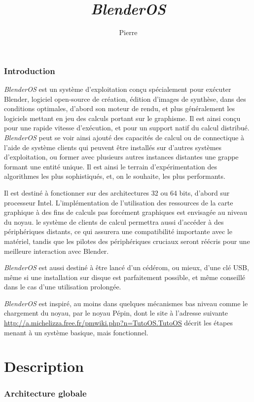 \documentclass{article}
\author{Pierre \bsc{Donat-Bouillud}}
\title{\emph{BlenderOS}}
\begin{document}
\maketitle

\section*{Introduction}
\emph{BlenderOS} est un système d'exploitation conçu spécialement pour exécuter Blender, logiciel open-source de création, édition d'images de synthèse, dans des conditions optimales, d'abord son moteur de rendu, et plus généralement les logiciels mettant en jeu des calculs portant sur le graphisme. Il est ainsi conçu pour une rapide vitesse d'exécution, et pour un support natif du calcul distribué. \emph{BlenderOS} peut se voir ainsi ajouté des capacités de calcul ou de connectique à l'aide de système clients qui peuvent être installés sur d'autres systèmes d'exploitation, ou former avec plusieurs autres instances distantes une grappe formant une entité unique. Il est ainsi le terrain d'expérimentation des algorithmes les plus sophistiqués, et, on le souhaite, les plus performants.
  
  Il est destiné à fonctionner sur des architectures 32 ou 64 bits, d'abord sur processeur Intel. L'implémentation de l'utilisation des ressources de la carte graphique à des fins de calculs pas forcément graphiques est envisagée au niveau du noyau. le système de clients de calcul permettra aussi d'accéder à des périphériques distants, ce qui assurera une compatibilité importante avec le matériel, tandis que les pilotes des périphériques cruciaux seront réécris pour une meilleure interaction avec Blender.

  \emph{BlenderOS} est aussi destiné à être lancé d'un cédérom, ou mieux, d'une clé USB, même si une installation sur disque est parfaitement possible, et même conseillé dans le cas d'une utilisation prolongée.
  
  \emph{BlenderOS} est inspiré, au moins dans quelques mécanismes bas niveau comme le chargement du noyau, par le noyau Pépin, dont le site à l'adresse suivante \url{http://a.michelizza.free.fr/pmwiki.php?n=TutoOS.TutoOS} décrit les étapes menant à un système basique, mais fonctionnel.


\part{Description}

\section{Architecture globale}
\end{document}

